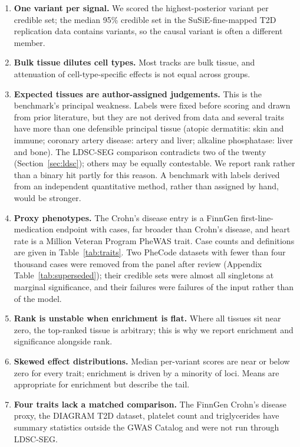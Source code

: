 \documentclass[11pt]{article}
\begin{document}
\begin{enumerate}\itemsep2pt
\item \textbf{One variant per signal.} We scored the highest-posterior variant per
credible set; the median 95\% credible set in the SuSiE-fine-mapped T2D replication data
contains \CSMEDIAN{} variants, so the causal variant is often a different member.
\item \textbf{Bulk tissue dilutes cell types.} Most tracks are bulk tissue, and
attenuation of cell-type-specific effects is not equal across groups.
\item \textbf{Expected tissues are author-assigned judgements.} This is the benchmark's
principal weakness. Labels were fixed before scoring and drawn from prior literature, but
they are not derived from data and several traits have more than one defensible principal
tissue (atopic dermatitis: skin and immune; coronary artery disease: artery and liver;
alkaline phosphatase: liver and bone). The LDSC-SEG comparison contradicts two of the twenty
(Section~\ref{sec:ldsc}); others may be equally contestable. We report rank rather than a
binary hit partly for this reason. A benchmark with labels derived from an independent
quantitative method, rather than assigned by hand, would be stronger.
\item \textbf{Proxy phenotypes.} The Crohn's disease entry is a FinnGen
first-line-medication endpoint with \CROHNCASES{} cases, far broader than Crohn's
disease, and heart rate is a Million Veteran Program PheWAS trait. Case counts and
definitions are given in Table~\ref{tab:traits}. Two PheCode datasets with fewer than
four thousand cases were removed from the panel after review (Appendix
Table~\ref{tab:superseded}); their credible sets were almost all singletons at marginal
significance, and their failures were failures of the input rather than of the model.
\item \textbf{Rank is unstable when enrichment is flat.} Where all tissues sit near
zero, the top-ranked tissue is arbitrary; this is why we report enrichment and
significance alongside rank.
\item \textbf{Skewed effect distributions.} Median per-variant scores are near or below
zero for every trait; enrichment is driven by a minority of loci. Means are appropriate
for enrichment but describe the tail.
\item \textbf{Four traits lack a matched comparison.} The FinnGen Crohn's disease
proxy, the DIAGRAM T2D dataset, platelet count and triglycerides have summary statistics
outside the GWAS Catalog and were not run through LDSC-SEG.

\end{enumerate}
\end{document}

